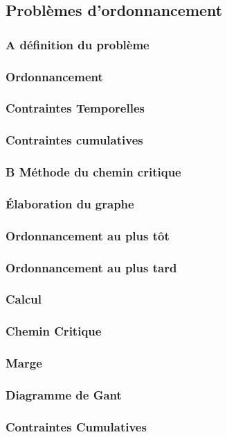 \newpage
\subsection{Problèmes d'ordonnancement}
\subsubsection{A définition du problème}
\subsubsection{Ordonnancement}
\subsubsection{Contraintes Temporelles}
\subsubsection{Contraintes cumulatives}
\subsubsection{B Méthode du chemin critique}\label{subsubsec:cc}
\subsubsection{Élaboration du graphe}
\subsubsection{Ordonnancement au plus tôt}
\subsubsection{Ordonnancement au plus tard}
\subsubsection{Calcul}
\subsubsection{Chemin Critique}
\subsubsection{Marge}
\subsubsection{Diagramme de Gant}
\subsubsection{Contraintes Cumulatives}\label{subsubsec:cc}

